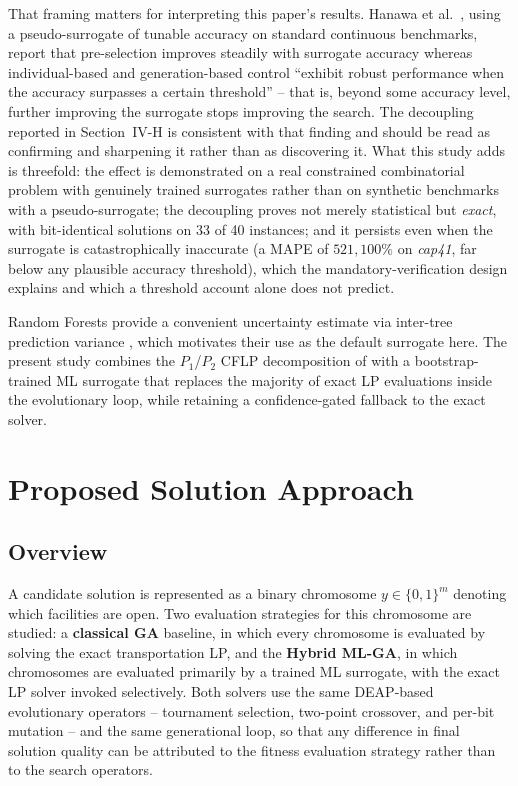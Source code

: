 \documentclass[conference]{IEEEtran}
\begin{document}
That framing matters for interpreting this paper's results. Hanawa et al.\
\citep{hanawa2025}, using a pseudo-surrogate of tunable accuracy on standard
continuous benchmarks, report that pre-selection improves steadily with
surrogate accuracy whereas individual-based and generation-based control
``exhibit robust performance when the accuracy surpasses a certain
threshold'' -- that is, beyond some accuracy level, further improving the
surrogate stops improving the search. The decoupling reported in
Section~IV-H is consistent with that finding and should be read as confirming
and sharpening it rather than as discovering it. What this study adds is
threefold: the effect is demonstrated on a real constrained combinatorial
problem with genuinely trained surrogates rather than on synthetic benchmarks
with a pseudo-surrogate; the decoupling proves not merely statistical but
\emph{exact}, with bit-identical solutions on 33 of 40 instances; and it
persists even when the surrogate is catastrophically inaccurate (a MAPE of
$521{,}100\%$ on \emph{cap41}, far below any plausible accuracy threshold),
which the mandatory-verification design explains and which a threshold account
alone does not predict.

Random Forests provide a convenient uncertainty estimate via inter-tree
prediction variance \citep{breiman2001}, which motivates their use as the
default surrogate here. The present study combines the $P_1$/$P_2$ CFLP
decomposition of \citep{ozsoydan2023,rahmani2014} with a bootstrap-trained ML
surrogate that replaces the majority of exact LP evaluations inside the
evolutionary loop, while retaining a confidence-gated fallback to the exact
solver.

\section{Proposed Solution Approach}

\subsection{Overview}

A candidate solution is represented as a binary chromosome $y \in \{0,1\}^m$
denoting which facilities are open. Two evaluation strategies for this
chromosome are studied: a \textbf{classical GA} baseline, in which every
chromosome is evaluated by solving the exact transportation LP, and the
\textbf{Hybrid ML-GA}, in which chromosomes are evaluated primarily by a
trained ML surrogate, with the exact LP solver invoked selectively. Both
solvers use the same DEAP-based \citep{fortin2012} evolutionary operators --
tournament selection, two-point crossover, and per-bit mutation -- and the
same generational loop, so that any difference in final solution quality can
be attributed to the fitness evaluation strategy rather than to the search
operators.
\end{document}
